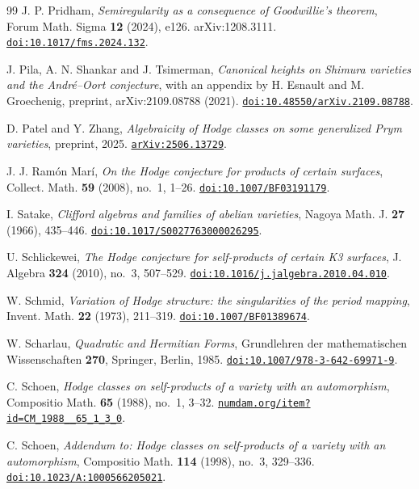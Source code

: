 \begin{thebibliography}{99}
J. P. Pridham,
\emph{Semiregularity as a consequence of Goodwillie's theorem},
Forum Math. Sigma \textbf{12} (2024), e126. arXiv:1208.3111.
\href{https://doi.org/10.1017/fms.2024.132}{\texttt{doi:10.1017/fms.2024.132}}.

J. Pila, A. N. Shankar and J. Tsimerman,
\emph{Canonical heights on Shimura varieties and the Andr\'e--Oort
conjecture}, with an appendix by H. Esnault and M. Groechenig,
preprint, arXiv:2109.08788 (2021).
\href{https://doi.org/10.48550/arXiv.2109.08788}{\texttt{doi:10.48550/arXiv.2109.08788}}.

D. Patel and Y. Zhang,
\emph{Algebraicity of Hodge classes on some generalized Prym varieties},
preprint, 2025.
\href{https://arxiv.org/abs/2506.13729}{\texttt{arXiv:2506.13729}}.

J. J. Ram\'on Mar\'i,
\emph{On the Hodge conjecture for products of certain surfaces},
Collect. Math. \textbf{59} (2008), no.~1, 1--26.
\href{https://doi.org/10.1007/BF03191179}{\texttt{doi:10.1007/BF03191179}}.

I. Satake,
\emph{Clifford algebras and families of abelian varieties},
Nagoya Math. J. \textbf{27} (1966), 435--446.
\href{https://doi.org/10.1017/S0027763000026295}{\texttt{doi:10.1017/S0027763000026295}}.

U. Schlickewei,
\emph{The Hodge conjecture for self-products of certain K3 surfaces},
J. Algebra \textbf{324} (2010), no.~3, 507--529.
\href{https://doi.org/10.1016/j.jalgebra.2010.04.010}{\texttt{doi:10.1016/j.jalgebra.2010.04.010}}.

W. Schmid,
\emph{Variation of Hodge structure: the singularities of the period mapping},
Invent. Math. \textbf{22} (1973), 211--319.
\href{https://doi.org/10.1007/BF01389674}{\texttt{doi:10.1007/BF01389674}}.

W. Scharlau,
\emph{Quadratic and Hermitian Forms},
Grundlehren der mathematischen Wissenschaften \textbf{270},
Springer, Berlin, 1985.
\href{https://doi.org/10.1007/978-3-642-69971-9}{\texttt{doi:10.1007/978-3-642-69971-9}}.

C. Schoen,
\emph{Hodge classes on self-products of a variety with an automorphism},
Compositio Math. \textbf{65} (1988), no.~1, 3--32.
\href{http://www.numdam.org/item?id=CM_1988__65_1_3_0}{\texttt{numdam.org/item?id=CM\_1988\_\_65\_1\_3\_0}}.

C. Schoen,
\emph{Addendum to: Hodge classes on self-products of a variety with an
automorphism},
Compositio Math. \textbf{114} (1998), no.~3, 329--336.
\href{https://doi.org/10.1023/A:1000566205021}{\texttt{doi:10.1023/A:1000566205021}}.


\end{thebibliography}
